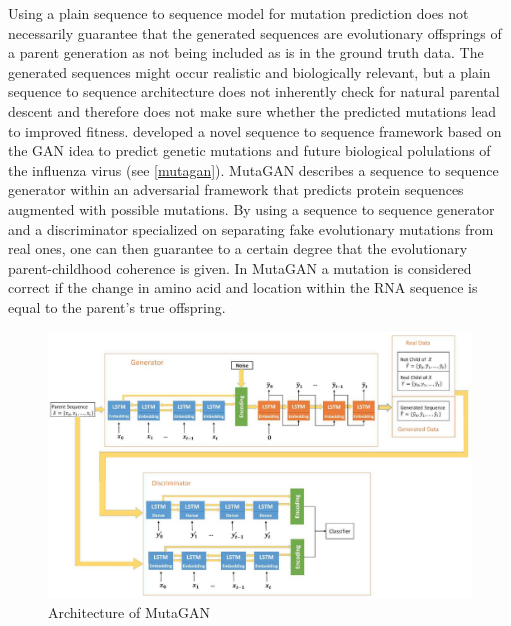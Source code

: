 Using a plain sequence to sequence model for mutation prediction does not necessarily guarantee that the generated sequences are evolutionary offsprings of a parent generation as not being included as is in the ground truth data. The generated sequences might occur realistic and biologically relevant, but a plain sequence to sequence architecture does not inherently check for natural parental descent and therefore does not make sure whether the predicted mutations lead to improved fitness. \cite{Berman2020} developed a novel sequence to sequence framework based on the \ac{GAN} idea to predict genetic mutations and future biological polulations of the influenza virus (see \autoref{mutagan}). MutaGAN describes a sequence to sequence generator within an adversarial framework that predicts protein sequences augmented with possible mutations. By using a sequence to sequence generator and a discriminator specialized on separating fake evolutionary mutations from real ones, one can then guarantee to a certain degree that the evolutionary parent-childhood coherence is given. In MutaGAN a mutation is considered correct if the change in amino acid and location within the \ac{RNA} sequence is equal to the parent's true offspring.  \cite{Berman2020}

\begin{figure}[ht]
	\centering
	\includegraphics[width=\linewidth]{figures/mutagan.png}
	\caption{Architecture of MutaGAN \cite{Berman2020}}
	\label{mutagan}
\end{figure}

